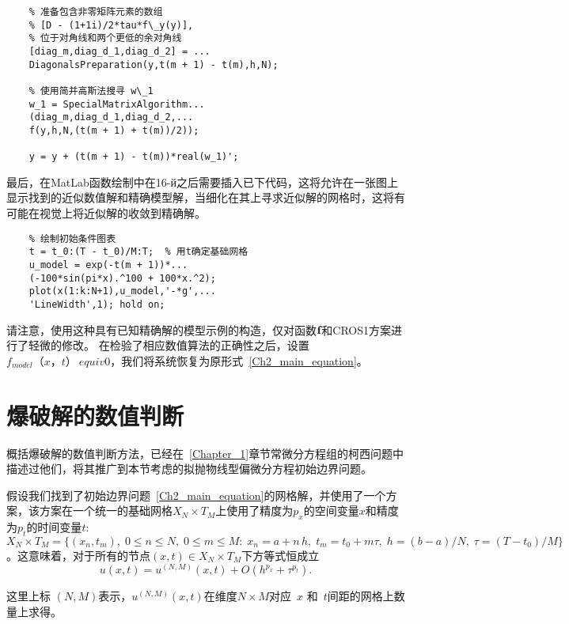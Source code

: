 \documentclass[twoside]{book}
\def\textbf{\bf}%
\begin{document}
\begin{CJK*}{GBK}{song}
\begin{lstlisting}
	% 准备包含非零矩阵元素的数组
	% [D - (1+1i)/2*tau*f\_y(y)],
	% 位于对角线和两个更低的余对角线
	[diag_m,diag_d_1,diag_d_2] = ...
	DiagonalsPreparation(y,t(m + 1) - t(m),h,N);
	
	% 使用简并高斯法搜寻 w\_1
	w_1 = SpecialMatrixAlgorithm...
	(diag_m,diag_d_1,diag_d_2,...
	f(y,h,N,(t(m + 1) + t(m))/2));
	
	y = y + (t(m + 1) - t(m))*real(w_1)';
	\end{lstlisting}
	
	最后，在MatLab函数绘制中在\hbox{16-й}之后需要插入已下代码，这将允许在一张图上显示找到的近似数值解和精确模型解，当细化在其上寻求近似解的网格时，这将有可能在视觉上将近似解的收敛到精确解。
	
	\begin{lstlisting}
	% 绘制初始条件图表
	t = t_0:(T - t_0)/M:T;  % 用t确定基础网格
	u_model = exp(-t(m + 1))*...
	(-100*sin(pi*x).^100 + 100*x.^2);
	plot(x(1:k:N+1),u_model,'-*g',...
	'LineWidth',1); hold on;
	\end{lstlisting}
	
	请注意，使用这种具有已知精确解的模型示例的构造，仅对函数$\emph{\textbf{f}}$和CROS1方案进行了轻微的修改。 在检验了相应数值算法的正确性之后，设置$ f_ {model}（x，t）\ equiv 0 $，我们将系统恢复为原形式~\eqref{Ch2_main_equation}。

	
	\section{爆破解的数值判断}
	\label{Ch2_numerical_diagnostics_of_the_solutions_blowup}
	
	概括爆破解的数值判断方法，已经在~\ref{Chapter_1}章节常微分方程组的柯西问题中描述过他们，将其推广到本节考虑的拟抛物线型偏微分方程初始边界问题。
	
	假设我们找到了初始边界问题~\eqref{Ch2_main_equation}的网格解，并使用了一个方案，该方案在一个统一的基础网格$X_N \times T_M$上使用了精度为$p_x$的空间变量$x$和精度为$p_t$的时间变量$t$: $X_N \times T_M = \{(x_n,t_m), \; 0 \leqslant n \leqslant N, \; 0 \leqslant m \leqslant M: \; x_n = a + n \, h,  \; t_m = t_0 + m \tau, \; h = (b - a)/N, \; \tau = (T - t_0)/M\}$。这意味着，对于所有的节点$(x,t) \in X_N \times T_M$下方等式恒成立
	\begin{equation}
	\label{Ch2_Runge-Romberg_formula_deducing_1}
	u(x,t) = u^{(N,M)}(x,t) + O(h^{p_x} + \tau^{p_t}).
	\end{equation}
	
	这里上标 $(N,M)$表示，$u^{(N,M)}(x,t)$在维度$N\times M$对应~$x$ 和~$t$间距的网格上数量上求得。
	

\end{CJK*}
\end{document}
